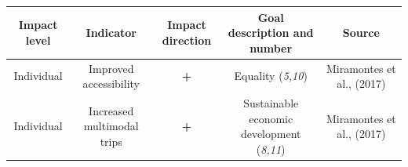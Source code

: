 \documentclass[
]{book}
\begin{document}
\begin{longtable}[]{@{}ccccc@{}}
\toprule
\begin{minipage}[b]{0.17\columnwidth}\centering
Impact level\strut
\end{minipage} & \begin{minipage}[b]{0.16\columnwidth}\centering
Indicator\strut
\end{minipage} & \begin{minipage}[b]{0.17\columnwidth}\centering
Impact direction\strut
\end{minipage} & \begin{minipage}[b]{0.17\columnwidth}\centering
Goal description and number\strut
\end{minipage} & \begin{minipage}[b]{0.17\columnwidth}\centering
Source\strut
\end{minipage}\tabularnewline
\midrule
\endhead
\begin{minipage}[t]{0.17\columnwidth}\centering
Individual\strut
\end{minipage} & \begin{minipage}[t]{0.16\columnwidth}\centering
Improved accessibility\strut
\end{minipage} & \begin{minipage}[t]{0.17\columnwidth}\centering
\textbf{+}\strut
\end{minipage} & \begin{minipage}[t]{0.17\columnwidth}\centering
Equality (\emph{5,10})\strut
\end{minipage} & \begin{minipage}[t]{0.17\columnwidth}\centering
Miramontes et al., (2017)\strut
\end{minipage}\tabularnewline
\begin{minipage}[t]{0.17\columnwidth}\centering
Individual\strut
\end{minipage} & \begin{minipage}[t]{0.16\columnwidth}\centering
Increased multimodal trips\strut
\end{minipage} & \begin{minipage}[t]{0.17\columnwidth}\centering
\textbf{+}\strut
\end{minipage} & \begin{minipage}[t]{0.17\columnwidth}\centering
Sustainable economic development (\emph{8,11})\strut
\end{minipage} & \begin{minipage}[t]{0.17\columnwidth}\centering
Miramontes et al., (2017)\strut

\end{minipage}
\end{longtable}
\end{document}
